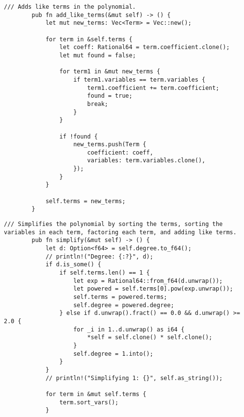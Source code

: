 {    \begin{lstlisting}[caption={The implementation of the \texttt{add\_like\_terms()} method for the \texttt{Polynomial} struct}, label={lst:polynomial-add-like-terms}]
        /// Adds like terms in the polynomial.
        pub fn add_like_terms(&mut self) -> () {
            let mut new_terms: Vec<Term> = Vec::new();

            for term in &self.terms {
                let coeff: Rational64 = term.coefficient.clone();
                let mut found = false;

                for term1 in &mut new_terms {
                    if term1.variables == term.variables {
                        term1.coefficient += term.coefficient;
                        found = true;
                        break;
                    }
                }

                if !found {
                    new_terms.push(Term {
                        coefficient: coeff,
                        variables: term.variables.clone(),
                    });
                }
            }

            self.terms = new_terms;
        }
    \end{lstlisting}

    \begin{lstlisting}[caption={The implementation of the \texttt{simplify()} method for the \texttt{Polynomial} struct}, label={lst:polynomial-simplify}]
        /// Simplifies the polynomial by sorting the terms, sorting the variables in each term, factoring each term, and adding like terms.
        pub fn simplify(&mut self) -> () {
            let d: Option<f64> = self.degree.to_f64();
            // println!("Degree: {:?}", d);
            if d.is_some() {
                if self.terms.len() == 1 {
                    let exp = Rational64::from_f64(d.unwrap());
                    let powered = self.terms[0].pow(exp.unwrap());
                    self.terms = powered.terms;
                    self.degree = powered.degree;
                } else if d.unwrap().fract() == 0.0 && d.unwrap() >= 2.0 {
                    for _i in 1..d.unwrap() as i64 {
                        *self = self.clone() * self.clone();
                    }
                    self.degree = 1.into();
                }
            }
            // println!("Simplifying 1: {}", self.as_string());

            for term in &mut self.terms {
                term.sort_vars();
            }


\end{lstlisting}}
